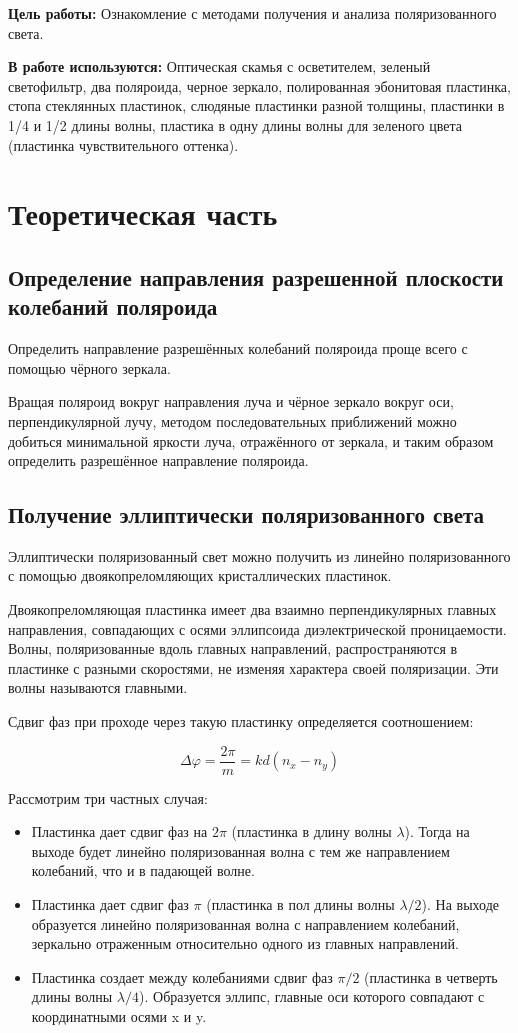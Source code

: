\documentclass{letask}
\begin{document}


\textbf{Цель работы:} Ознакомление с методами получения и анализа поляризованного света.

\textbf{В работе используются:} Оптическая скамья с осветителем, зеленый светофильтр, два поляроида, черное зеркало, полированная эбонитовая пластинка, стопа стеклянных пластинок, слюдяные пластинки разной толщины, пластинки в 1/4 и 1/2 длины волны, пластика в одну длины волны для зеленого цвета (пластинка чувствительного оттенка).
 
\section{Теоретическая часть}

\subsection{Определение направления разрешенной плоскости колебаний поляроида}

Определить направление разрешённых колебаний поляроида проще всего с помощью чёрного зеркала.

Вращая поляроид вокруг направления луча и чёрное зеркало вокруг
оси, перпендикулярной лучу, методом последовательных приближений
можно добиться минимальной яркости луча, отражённого от зеркала,
и таким образом определить разрешённое направление поляроида.


\subsection{Получение эллиптически поляризованного света}

Эллиптически
поляризованный свет можно получить из линейно поляризованного с
помощью двоякопреломляющих кристаллических пластинок.

Двоякопреломляющая пластинка имеет два взаимно перпендикулярных главных направления, совпадающих с осями эллипсоида диэлектрической проницаемости. Волны, поляризованные вдоль главных направлений, распространяются в пластинке с разными скоростями, не изменяя характера своей поляризации. Эти волны называются главными. 

Сдвиг фаз при проходе через такую пластинку определяется соотношением:

\[\Delta \varphi = \dfrac{2\pi}{m} = kd(n_x-n_y)\]

Рассмотрим три частных случая:
\begin{itemize}
\item Пластинка дает сдвиг фаз на $2\pi$ (пластинка в длину волны $\lambda$). Тогда на выходе будет линейно поляризованная волна с тем же направлением колебаний, что и в падающей волне.
\item Пластинка дает сдвиг фаз $\pi$ (пластинка в пол длины волны $\lambda/2$). На выходе образуется линейно поляризованная волна с направлением колебаний, зеркально отраженным относительно одного из главных направлений.
\item Пластинка создает между колебаниями сдвиг фаз $\pi/2$ (пластинка в четверть длины волны $\lambda/4$). Образуется эллипс, главные оси которого совпадают с координатными осями x и y.
\end{itemize}
\end{document}
